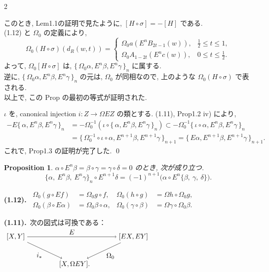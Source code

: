 \documentclass[10pt, leqno]{ltjsarticle}
\newcommand{\Ex}{E}        %
\newcommand{\Ox}{\Omega}   %
\newcommand{\todai}[2][]{\{\,#2\,\}_{#1}}      %
\numberwithin{equation}{section}
\theoremstyle{plain}
\newtheorem{proposition}[theorem]{Proposition}
\theoremstyle{definition}
\theoremstyle{remark}
\begin{document}
\begin{paracol}{2}

\noindent
このとき, Lem1.1の証明で見たように,
\([H\circ \sigma] = -[H]\) である.\\
(1.12) と \(\Omega_0\) の定義により,
\[
\Omega_0(H\circ \sigma)(d_R(w,t))=
\begin{cases}
\Omega_0 a(\Ex^{n}B_{2t-1}(w)), 
& \tfrac12\le t\le 1,\\[2mm]
\Omega_0 A_{1-2t}(\Ex^{n}c(w)), 
& 0\le t\le \tfrac12.
\end{cases}
\]
よって,
\(\Omega_0[H\circ \sigma]\)
は, 
\(\todai[n]{\Omega_0\alpha, E^n\beta, E^n\gamma}\)
に属する.\\
逆に, 
\(\todai[n]{\Omega_0\alpha, E^n\beta, E^n\gamma}\)
の元は,
\(\Omega_0\) が同相なので,
上のような \(\Omega_0(H\circ \sigma)\) で表される.\\
以上で, この Prop の最初の等式が証明された.

\(\iota\) を, canonical injection \(i:Z\to \Omega EZ\)
の類とする.
(1.11), Prop1.2 iv) により,
\[
\begin{align*}
  -E\todai[n]{\alpha, E^n\beta, E^n\gamma}
  & = -\Omega_0^{-1}(\iota \circ \todai[n]{\alpha, E^n\beta, E^n\gamma})
  \subset -\Omega_0^{-1}\todai[n]{\iota\circ\alpha, E^n\beta, E^n\gamma}\\
  & = \todai[n+1]{\Omega_0^{-1}\circ\iota\circ\alpha, E^{n+1}\beta, E^{n+1}\gamma}
  = \todai[n+1]{E\alpha, E^{n+1}\beta, E^{n+1}\gamma}.
\end{align*}
\]
これで, Prop1.3 の証明が完了した.
\qed

\begin{proposition}\label{prop:1-4}
$\alpha\circ \Ex^n\beta=\beta\circ\gamma=\gamma\circ\delta=0$ のとき, 
次が成り立つ.
\[
\{\alpha,\ \Ex^n\beta,\ \Ex^n\gamma\}_n\circ\Ex^{n+1}\delta
=
(-1)^{n+1}\bigl(\alpha\circ \Ex^n\{\beta,\ \gamma,\ \delta\}\bigr).
\]
\end{proposition}

\switchcolumn

\noindent
\textbf{(1.12).}\
\(
\begin{aligned}
\Omega_0(g\circ Ef)&=\Omega_0 g\circ f, &
\Omega_0(h\circ g)&=\Ox h\circ \Omega_0 g,\\
\Omega_0(\beta\circ E\alpha)&=\Omega_0 \beta\circ \alpha, &
\Omega_0(\gamma\circ \beta)&=\Ox\gamma\circ \Omega_0\beta .
\end{aligned}
\)

\noindent
\textbf{(1.11).}\ 次の図式は可換である：\\
\(
\begin{tikzpicture}[baseline=(current bounding box.center)]
\node (PX) at (-3,0) {$[X, Y]$};
\node (P1) at (3,0) {$[EX, EY]$};
\node (P2) at (0,-1.4) {$[X, \Ox EY].$};
\draw[->] (PX)--node[above] {$E$} (P1);
\draw[->] (PX)--node[below left] {$i_*$} (P2);
\draw[->] (P1)--node[below right] {$\Omega_0$} (P2);
\end{tikzpicture}
\)


\end{paracol}
\end{document}
